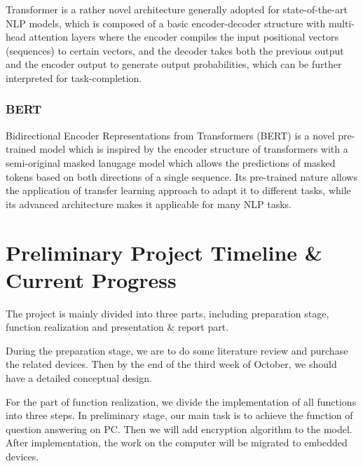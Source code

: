 \documentclass[a4paper]{article}
\begin{document}
Transformer is a rather novel architecture generally adopted for state-of-the-art NLP models, which is composed of a basic encoder-decoder structure with multi-head attention layers where the encoder compiles the input positional vectors (sequences) to certain vectors, and the decoder takes both the previous output and the encoder output to generate output probabilities, which can be further interpreted for task-completion.

\subsubsection{BERT}
Bidirectional Encoder Representations from Transformers (BERT) is a novel pre-trained model which is inspired by the encoder structure of transformers with a semi-original masked lanugage model which allows the predictions of masked tokens based on both directions of a single sequence. Its pre-trained nature allows the application of transfer learning approach to adapt it to different tasks, while its advanced architecture makes it applicable for many NLP tasks.

\section{Preliminary Project Timeline \& Current Progress}
The project is mainly divided into three parts, including preparation stage, function realization and presentation \& report part.

During the preparation stage, we are to do some literature review and purchase the related devices. Then by the end of the third week of October, we should have a detailed conceptual design.

For the part of function realization, we divide the implementation of all functions into three steps. In preliminary stage, our main task is to achieve the function of question answering on PC. Then we will add encryption algorithm to the model. After implementation, the work on the computer will be migrated to embedded devices. 
\end{document}
